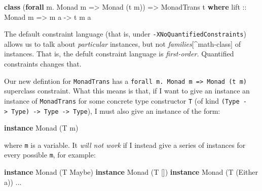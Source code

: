\documentclass[
  11pt,
]{book}
\newenvironment{Shaded}{}{}
\newcommand{\DataTypeTok}[1]{\textcolor[rgb]{0.56,0.13,0.00}{#1}}
\newcommand{\KeywordTok}[1]{\textcolor[rgb]{0.00,0.44,0.13}{\textbf{#1}}}
\newcommand{\NormalTok}[1]{#1}
\newcommand{\OperatorTok}[1]{\textcolor[rgb]{0.40,0.40,0.40}{#1}}
\newcommand{\OtherTok}[1]{\textcolor[rgb]{0.00,0.44,0.13}{#1}}
\theoremstyle{nonumberplain}
\begin{document}
\begin{Shaded}
\begin{Highlighting}[]
\KeywordTok{class}\NormalTok{ (}\KeywordTok{forall}\NormalTok{ m}\OperatorTok{.} \DataTypeTok{Monad}\NormalTok{ m }\OtherTok{=\textgreater{}} \DataTypeTok{Monad}\NormalTok{ (t m)) }\OtherTok{=\textgreater{}} \DataTypeTok{MonadTrans}\NormalTok{ t }\KeywordTok{where}
\OtherTok{  lift ::} \DataTypeTok{Monad}\NormalTok{ m }\OtherTok{=\textgreater{}}\NormalTok{ m a }\OtherTok{{-}\textgreater{}}\NormalTok{ t m a}
\end{Highlighting}
\end{Shaded}

The default constraint language (that is, under
\texttt{-XNoQuantifiedConstraints}) allows us to talk about
\emph{particular} instances, but not \emph{families}{[}\^{}math-class{]}
of instances. That is, the defult constraint language is
\emph{first-order.} Quantified constraints changes that.

Our new defintion for \texttt{MonadTrans} has a
\texttt{forall\ m.\ Monad\ m\ =\textgreater{}\ Monad\ (t\ m)} superclass
constraint. What this means is that, if I want to give an instance an
instance of \texttt{MonadTrans} for some concrete type constructor
\texttt{T} (of kind
\texttt{(Type\ -\textgreater{}\ Type)\ -\textgreater{}\ Type\ -\textgreater{}\ Type}),
I must also give an instance of the form:

\begin{Shaded}
\begin{Highlighting}[]
\KeywordTok{instance} \DataTypeTok{Monad}\NormalTok{ (}\DataTypeTok{T}\NormalTok{ m)}
\end{Highlighting}
\end{Shaded}

\noindent where \texttt{m} is a variable. It \emph{will not work} if I
instead give a series of instances for every possible \texttt{m}, for
example:

\begin{Shaded}
\begin{Highlighting}[]
\KeywordTok{instance} \DataTypeTok{Monad}\NormalTok{ (}\DataTypeTok{T} \DataTypeTok{Maybe}\NormalTok{)}
\KeywordTok{instance} \DataTypeTok{Monad}\NormalTok{ (}\DataTypeTok{T}\NormalTok{ [])}
\KeywordTok{instance} \DataTypeTok{Monad}\NormalTok{ (}\DataTypeTok{T}\NormalTok{ (}\DataTypeTok{Either}\NormalTok{ a))}
\OperatorTok{...}
\end{Highlighting}
\end{Shaded}
\end{document}
